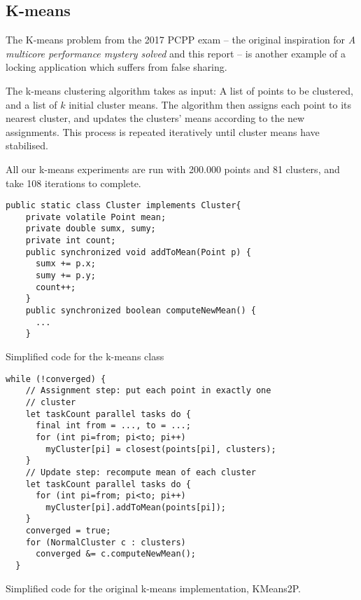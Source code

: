 \subsection{K-means}
The K-means problem from the 2017 PCPP exam -- the original inspiration for
\textit{A multicore performance mystery solved}\cite{mystery} and this report --
is another example of a locking application which suffers from false sharing.

The k-means clustering algorithm takes as input: A list of points to be
clustered, and a list of $k$ initial cluster means. The algorithm then
assigns each point to its nearest cluster, and updates the clusters'
means according to the new assignments. This process is repeated iteratively
until cluster means have stabilised.

All our k-means experiments are run with 200.000 points and 81 clusters, and
take 108 iterations to complete.

\begin{code}
\begin{Verbatim}[frame=single]
  public static class Cluster implements Cluster{
    private volatile Point mean;
    private double sumx, sumy;
    private int count;
    public synchronized void addToMean(Point p) {
      sumx += p.x;
      sumy += p.y;
      count++;
    }
    public synchronized boolean computeNewMean() {
      ...
    }
\end{Verbatim}
	\caption{Simplified code for the k-means  class}
	\label{code:cluster}
\end{code}

\begin{code}
\begin{Verbatim}[frame=single]
  while (!converged) {
    // Assignment step: put each point in exactly one
    // cluster
    let taskCount parallel tasks do {
      final int from = ..., to = ...;
      for (int pi=from; pi<to; pi++) 
        myCluster[pi] = closest(points[pi], clusters);
    }
    // Update step: recompute mean of each cluster
    let taskCount parallel tasks do {
      for (int pi=from; pi<to; pi++)
        myCluster[pi].addToMean(points[pi]);
    }
    converged = true;
    for (NormalCluster c : clusters)
      converged &= c.computeNewMean();
  }
\end{Verbatim}
	\caption{Simplified code for the original k-means implementation, KMeans2P.}
	\label{code:kmeans2p}
\end{code}

